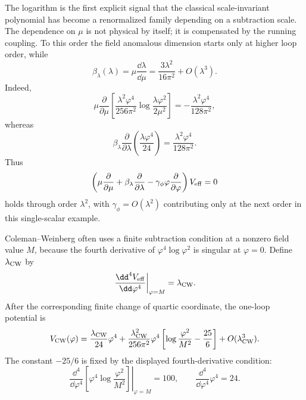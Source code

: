 The logarithm is the first explicit signal that the classical scale-invariant
polynomial has become a renormalized family depending on a subtraction scale.
The dependence on \(\mu\) is not physical by itself; it is compensated by the
running coupling.  To this order the field anomalous dimension starts only at
higher loop order, while
\[
  \beta_\lambda(\lambda)
  =
  \mu\frac{\dd\lambda}{\dd\mu}
  =
  \frac{3\lambda^2}{16\pi^2}+O(\lambda^3).
\]
Indeed,
\[
  \mu\frac{\partial}{\partial\mu}
  \left[
    \frac{\lambda^2\varphi^4}{256\pi^2}
    \log\frac{\lambda\varphi^2}{2\mu^2}
  \right]
  =
  -\frac{\lambda^2\varphi^4}{128\pi^2},
\]
whereas
\[
  \beta_\lambda\frac{\partial}{\partial\lambda}
  \left(\frac{\lambda\varphi^4}{24}\right)
  =
  \frac{\lambda^2\varphi^4}{128\pi^2}.
\]
Thus
\[
  \left(
    \mu\frac{\partial}{\partial\mu}
    +
    \beta_\lambda\frac{\partial}{\partial\lambda}
    -
    \gamma_\phi\varphi\frac{\partial}{\partial\varphi}
  \right)
  V_{\rm eff}=0
\]
holds through order \(\lambda^2\), with
\(\gamma_\phi=O(\lambda^2)\) contributing only at the next order in this
single-scalar example.

Coleman--Weinberg often uses a finite subtraction condition at a nonzero field
value \(M\), because the fourth derivative of \(\varphi^4\log\varphi^2\) is
singular at \(\varphi=0\).  Define \(\lambda_{\rm CW}\) by
\[
  \left.
  \frac{\dd^4 V_{\rm eff}}{\dd\varphi^4}
  \right|_{\varphi=M}
  =
  \lambda_{\rm CW}.
\]
After the corresponding finite change of quartic coordinate, the one-loop
potential is
\begin{equation}
  V_{\rm CW}(\varphi)
  =
  \frac{\lambda_{\rm CW}}{24}\varphi^4
  +
  \frac{\lambda_{\rm CW}^2}{256\pi^2}\varphi^4
  \left[
    \log\frac{\varphi^2}{M^2}
    -\frac{25}{6}
  \right]
  +O(\lambda_{\rm CW}^3).
  \label{eq:cw-renormalization-condition-potential}
\end{equation}
The constant \(-25/6\) is fixed by the displayed fourth-derivative condition:
\[
  \left.
  \frac{\dd^4}{\dd\varphi^4}
  \left[
    \varphi^4\log\frac{\varphi^2}{M^2}
  \right]
  \right|_{\varphi=M}
  =
  100,
  \qquad
  \frac{\dd^4}{\dd\varphi^4}\varphi^4=24 .
\]


